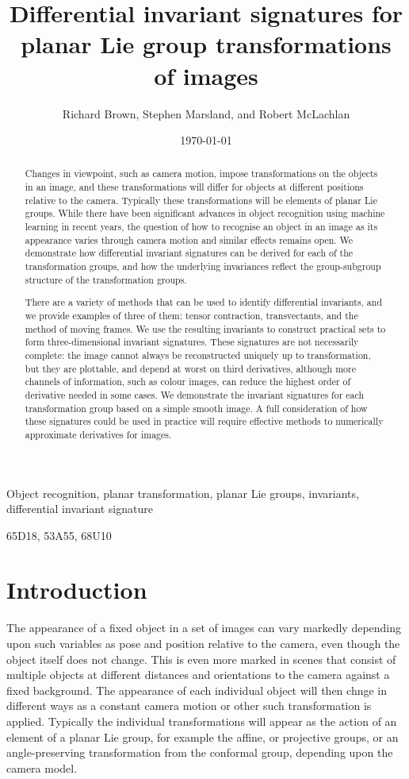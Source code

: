 \documentclass[review,onefignum,onetabnum]{siamonline190516}
\date{\today}
\title{Differential invariant signatures for planar Lie group transformations of images}
\author{Richard Brown, Stephen Marsland, and Robert McLachlan}
\begin{document}
\maketitle
\begin{abstract}
Changes in viewpoint, such as camera motion, impose transformations on the objects in an image, and these transformations will differ for objects at different positions relative to the camera. Typically these transformations will be elements of planar Lie groups. While there have been significant advances in object recognition using machine learning in recent years, the question of how to recognise an object in an image as its appearance varies through camera motion and similar effects remains open. We demonstrate how differential invariant signatures can be derived for each of the transformation groups, and how the underlying invariances reflect the group-subgroup structure of the transformation groups. 

There are a variety of methods that can be used to identify differential invariants, and we provide examples of three of them: tensor contraction, transvectants, and the method of moving frames. We use the resulting invariants to construct practical sets to form three-dimensional invariant signatures. These signatures are not necessarily complete: the image cannot always be reconstructed uniquely up to transformation, but they are plottable, and depend at worst on third derivatives, although more channels of information, such as colour images, can reduce the highest order of derivative needed in some cases. We demonstrate the invariant signatures for each transformation group based on a simple smooth image. A full consideration of how these signatures could be used in practice will require effective methods to numerically approximate derivatives for images.
\end{abstract}


\begin{keywords}
Object recognition, planar transformation, planar Lie groups, invariants, differential invariant signature
\end{keywords}

\begin{AMS}
65D18, 53A55, 68U10
\end{AMS}

\section{Introduction}
The appearance of a fixed object in a set of images can vary markedly depending upon such variables as pose and position relative to the camera, even though the object itself does not change. This is even more marked in scenes that consist of multiple objects at different distances and orientations to the camera against a fixed background. The appearance of each individual object will then chnge in different ways as a constant camera motion or other such transformation is applied. Typically the individual transformations will appear as the action of an element of a planar Lie group, for example the affine, or projective groups, or an angle-preserving transformation from the conformal group, depending upon the camera model. 
\end{document}
